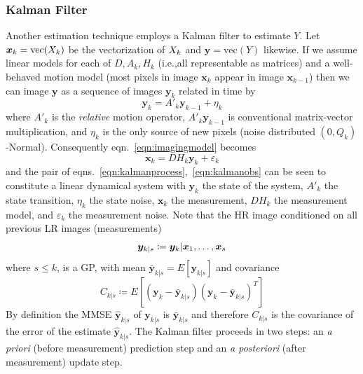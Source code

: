 \subsubsection{Kalman Filter}
Another estimation technique employs a Kalman filter \cite{elad1999} to estimate \(Y\).
%
Let \(\bm{x}_k = \text{vec}(X_k)\) be the vectorization of \(X_k\) and \(\bm{y} = \text{vec}(Y)\) likewise.
%
If we assume linear models for each of \(D, A_k, H_k\) (i.e.,all representable as matrices) and a well-behaved motion model (most pixels in image \(\bm{x}_k\) appear in image \(\bm{x}_{k-1}\)) then we can image \(\bm{y}\) as a sequence of images \(\bm{y}_k\) related in time by
\begin{equation}
    \bm{y}_k = A'_k \bm{y}_{k-1} + \eta_k
    \label{eqn:kalmanprocess}
\end{equation}
%
where \(A'_k\) is the \textit{relative} motion operator, \(A'_k\bm{y}_{k-1}\) is conventional matrix-vector multiplication, and \(\eta_k\) is the only source of new pixels (noise distributed \((0, Q_k)\)-Normal).
%
Consequently eqn.~\eqref{eqn:imagingmodel} becomes
\begin{equation}
    \bm{x}_k = DH_k\bm{y}_k + \varepsilon_k
    \label{eqn:kalmanobs}
\end{equation}
and the pair of eqns.~\eqref{eqn:kalmanprocess},~\eqref{eqn:kalmanobs} can be seen to constitute a linear dynamical system with \(\bm{y}_k\) the state of the system, \(A'_k\) the state transition, \(\eta_k\) the state noise, \(\bm{x}_k\) the measurement, \(DH_k\) the measurement model, and \(\varepsilon_k\) the measurement noise.
%
Note that the HR image conditioned on all previous LR images (measurements)
\begin{equation}
    \bm{y}_{k|s} \coloneqq \bm{y}_k|\bm{x}_1, \mathellipsis, \bm{x}_s
\end{equation}
where \(s \leq k\), is a GP, with mean \(\bar{\bm{y}}_{k|s} = E\left[\bm{y}_{k|s}\right]\)
and covariance
\begin{equation}
    C_{k|s} \coloneqq E\left[ (\bm{y}_k - \bar{\bm{y}}_{k|s})(\bm{y}_k - \bar{\bm{y}}_{k|s})^T  \right]
\end{equation}
%
By definition the MMSE \(\hat{\bm{y}}_{k|s}\) of \(\bm{y}_{k|s}\) is \(\bar{\bm{y}}_{k|s}\) and therefore \(C_{k|s}\) is the covariance of the error of the estimate \(\hat{\bm{y}}_{k|s}\).
%
The Kalman filter proceeds in two steps: an \textit{a priori} (before measurement) prediction step and an \textit{a posteriori} (after measurement) update step.
